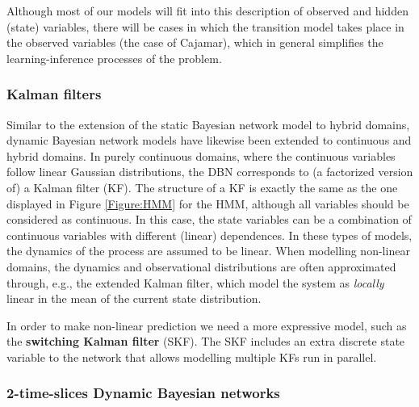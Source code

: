 Although most of our models will fit into this description of observed and hidden (state) variables, there will be cases in which the transition model takes place in the observed variables (the case of Cajamar), which in general simplifies the learning-inference processes of the problem.


\subsubsection{Kalman filters}
Similar to the extension of the static Bayesian network model to hybrid domains, dynamic Bayesian network models have likewise been extended to continuous and hybrid domains. In purely continuous domains, where the continuous variables follow linear Gaussian distributions, the DBN corresponds to (a factorized version of) a Kalman filter (KF). The structure of a KF is exactly the same as the one displayed in Figure \ref{Figure:HMM} for the HMM, although all variables should be considered as continuous. In this case, the state variables can be a combination of continuous variables with different (linear) dependences. In these types of models, the dynamics of the process are assumed to be linear. When modelling non-linear domains, the dynamics and observational distributions are often approximated through, e.g., the extended Kalman filter, which model the system as \textit{locally} linear in the mean of the current state distribution. 

In order to make non-linear prediction we need a more expressive model, such as the \textbf{switching Kalman filter} (SKF). The SKF includes an extra discrete state variable to the network that allows modelling multiple KFs run in parallel. 

\subsubsection{2-time-slices Dynamic Bayesian networks}	

